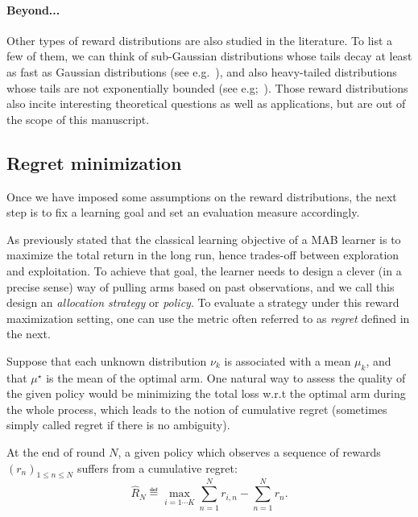 \paragraph{Beyond...}

Other types of reward distributions are also studied in the literature. To list a few of them, we can think of sub-Gaussian distributions whose tails decay at least as fast as Gaussian distributions (see e.g.~\citealt{}), and also heavy-tailed distributions whose tails are not exponentially bounded (see e.g;~\citealt{yu2018heavy}). Those reward distributions also incite interesting theoretical questions as well as applications, but are out of the scope of this manuscript.

\subsection{Regret minimization}\label{sec:mab.model.regret}

Once we have imposed some assumptions on the reward distributions, the next step is to fix a learning goal and set an evaluation measure accordingly.

As previously stated that the classical learning objective of a MAB learner is to maximize the total return in the long run, hence trades-off between exploration and exploitation. To achieve that goal, the learner needs to design a clever (in a precise sense) way of pulling arms based on past observations, and we call this design an \emph{allocation strategy} or \emph{policy}. To evaluate a strategy under this reward maximization setting, one can use the metric often referred to as \emph{regret} defined in the next. 

Suppose that each unknown distribution $\nu_k$ is associated with a mean $\mu_k$, and that $\mu^{\star}$ is the mean of the optimal arm. One natural way to assess the quality of the given policy would be minimizing the total loss w.r.t the optimal arm during the whole process, which leads to the notion of \gls{cumulative regret} (sometimes simply called regret if there is no ambiguity).

\begin{definition}\label{def:mab.cumulative_regret}
\begin{leftbar}[defnbar]
	At the end of round $N$, a given policy which observes a sequence of rewards $(r_n)_{1 \leq n \leq N}$ suffers from a cumulative regret:
	\[
		\hat{R}_N \eqdef \max_{i=1\cdots K} \sum_{n=1}^N r_{i,n} - \sum_{n=1}^N r_n.
	\]
\end{leftbar}
\end{definition}


